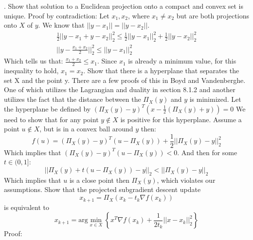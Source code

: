 \documentclass{article}
\begin{document}
\newpage
{}. Show that solution to a Euclidean projection onto a compact and convex set is unique. 
\newline
Proof by contradiction:
Let $x_1, x_2$, where $x_1 \neq x_2$ but are both projections onto $X$ of $y$. We know that $|| y - x_1 || = || y - x_2 ||$.  
\begin{align*}
	\frac{1}{2}|| y - x_1 + y - x_2||^2_2 \leq \frac{1}{2}|| y - x_1 ||^2_2 + \frac{1}{2}|| y - x_2 ||^2_2 \\
	|| y - \frac{x_1 + x_2}{2} ||_2^2 \leq || y - x_1 ||^2_2
\end{align*}
Which tells us that: $ \frac{x_1 + x_2}{2} \leq x_1 $. Since $x_1$ is already a minimum value, for this inequality to hold, $x_1 = x_2$. 
\newline\newline
Show that there is a hyperplane that separates the set X and the point y. There are a few proofs of this in Boyd and Vandenberghe. One of which utilizes the Lagrangian and duality in section 8.1.2 and another utilizes the fact that the distance between the $\Pi_X(y)$ and $y$ is minimized. \newline \newline
Let the hyperplane be defined by $(\Pi_X(y) - y)^T(x - \frac{1}{2}(\Pi_X(y) + y)) = 0 $ We need to show that for any point $y \not\in X$ is positive for this hyperplane. Assume a point $u \not\in X$, but is in a convex ball around $y$ then:
\begin{equation*}
	f(u) = (\Pi_X(y) - y)^T(u-\Pi_X(y)) + \frac{1}{2}||\Pi_X(y) - y||^2_2
\end{equation*} 
Which implies that $(\Pi_X(y)-y)^T(u-\Pi_X(y)) < 0$. And then for some $ t \in (0, 1]$:
\begin{equation*}
	|| \Pi_X(y) + t(u-\Pi_X(y)) - y ||_2 < ||\Pi_X(y) - y||_2
\end{equation*}
Which implies that $u$ is a close point then $\Pi_X(y)$, which violates our assumptions. 
\newline\newline
Show that the projected subgradient descent update
\begin{equation*}
	x_{k+1} = \Pi_X(x_k - t_k\nabla f(x_k))
\end{equation*}
is equivalent to
\begin{equation*}
	x_{k+1}  = \text{arg}\min_{x\in X}\left\{x^T\nabla f(x_k) + \frac{1}{2t_k}||x - x_k||^2_2\right\}
\end{equation*}
Proof:
\end{document}
